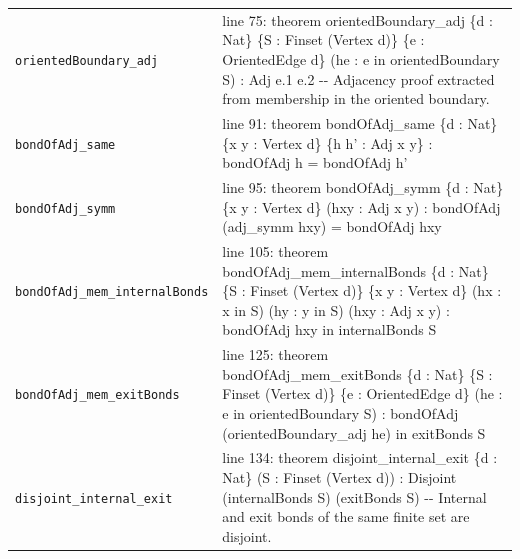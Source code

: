 \documentclass[10pt]{article}
\begin{document}
\begin{longtable}{>{\raggedright\arraybackslash}p{} >{\raggedright\arraybackslash}p{}}
\texttt{orientedBoundary\_\allowbreak{}adj} & {\ttfamily\scriptsize line 75:\allowbreak{} theorem orientedBoundary\_\allowbreak{}adj \{d :\allowbreak{} Nat\} \{S :\allowbreak{} Finset (\allowbreak{}Vertex d)\allowbreak{}\} \{e :\allowbreak{} OrientedEdge d\} (\allowbreak{}he :\allowbreak{} e in orientedBoundary S)\allowbreak{} :\allowbreak{} Adj e.\allowbreak{}1 e.\allowbreak{}2 -\allowbreak{}-\allowbreak{} Adjacency proof extracted from membership in the oriented boundary.\allowbreak{}} \\[0.45em]
\texttt{bondOfAdj\_\allowbreak{}same} & {\ttfamily\scriptsize line 91:\allowbreak{} theorem bondOfAdj\_\allowbreak{}same \{d :\allowbreak{} Nat\} \{x y :\allowbreak{} Vertex d\} \{h h' :\allowbreak{} Adj x y\} :\allowbreak{} bondOfAdj h =\allowbreak{} bondOfAdj h'} \\[0.45em]
\texttt{bondOfAdj\_\allowbreak{}symm} & {\ttfamily\scriptsize line 95:\allowbreak{} theorem bondOfAdj\_\allowbreak{}symm \{d :\allowbreak{} Nat\} \{x y :\allowbreak{} Vertex d\} (\allowbreak{}hxy :\allowbreak{} Adj x y)\allowbreak{} :\allowbreak{} bondOfAdj (\allowbreak{}adj\_\allowbreak{}symm hxy)\allowbreak{} =\allowbreak{} bondOfAdj hxy} \\[0.45em]
\texttt{bondOfAdj\_\allowbreak{}mem\_\allowbreak{}internalBonds} & {\ttfamily\scriptsize line 105:\allowbreak{} theorem bondOfAdj\_\allowbreak{}mem\_\allowbreak{}internalBonds \{d :\allowbreak{} Nat\} \{S :\allowbreak{} Finset (\allowbreak{}Vertex d)\allowbreak{}\} \{x y :\allowbreak{} Vertex d\} (\allowbreak{}hx :\allowbreak{} x in S)\allowbreak{} (\allowbreak{}hy :\allowbreak{} y in S)\allowbreak{} (\allowbreak{}hxy :\allowbreak{} Adj x y)\allowbreak{} :\allowbreak{} bondOfAdj hxy in internalBonds S} \\[0.45em]
\texttt{bondOfAdj\_\allowbreak{}mem\_\allowbreak{}exitBonds} & {\ttfamily\scriptsize line 125:\allowbreak{} theorem bondOfAdj\_\allowbreak{}mem\_\allowbreak{}exitBonds \{d :\allowbreak{} Nat\} \{S :\allowbreak{} Finset (\allowbreak{}Vertex d)\allowbreak{}\} \{e :\allowbreak{} OrientedEdge d\} (\allowbreak{}he :\allowbreak{} e in orientedBoundary S)\allowbreak{} :\allowbreak{} bondOfAdj (\allowbreak{}orientedBoundary\_\allowbreak{}adj he)\allowbreak{} in exitBonds S} \\[0.45em]
\texttt{disjoint\_\allowbreak{}internal\_\allowbreak{}exit} & {\ttfamily\scriptsize line 134:\allowbreak{} theorem disjoint\_\allowbreak{}internal\_\allowbreak{}exit \{d :\allowbreak{} Nat\} (\allowbreak{}S :\allowbreak{} Finset (\allowbreak{}Vertex d)\allowbreak{})\allowbreak{} :\allowbreak{} Disjoint (\allowbreak{}internalBonds S)\allowbreak{} (\allowbreak{}exitBonds S)\allowbreak{} -\allowbreak{}-\allowbreak{} Internal and exit bonds of the same finite set are disjoint.\allowbreak{}} \\[0.45em]
\end{longtable}
\end{document}
